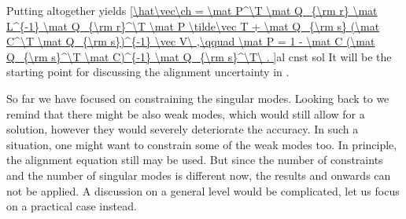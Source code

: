 Putting altogether yields
\eqref{\hat\vec\ch =
	\mat P^\T \mat Q_{\rm r} \mat L^{-1} \mat Q_{\rm r}^\T \mat P \tilde\vec T
	+ \mat Q_{\rm s} (\mat C^\T \mat Q_{\rm s})^{-1} \vec V\ ,\qquad
	\mat P = 1 - \mat C (\mat Q_{\rm s}^\T \mat C)^{-1} \mat Q_{\rm s}^\T\ .
}{al cnst sol}
It will be the starting point for discussing the alignment uncertainty in .

\iffalse
If we neglect the experimental errors that enter the $\tilde\vec T$ vector, it can be calculated from \Eq{al exact fit equation}: $\tilde\vec T = \bar\mat S \vec\ch$. We recall that $\vec\ch$ is the vector of true (not estimated) residuals. As the singular modes of $\tilde\mat S$ and $\bar\mat S$ are the same, one finds that $\bar\mat S E = 0$ too. Consequently, \Eq{al T no sing cont} leads to $\La = 0$. If the experimental errors are not neglected, the relation becomes only approximative: $\La \approx 0$. This provides a consistency check that may be used during real data analysis.
\fi

So far we have focused on constraining the singular modes. Looking back to  we remind that there might be also weak modes, which would still allow for a solution, however they would severely deteriorate the accuracy. In such a situation, one might want to constrain some of the weak modes too. In principle, the alignment equation  still may be used. But since the number of constraints and the number of singular modes is different now, the results  and onwards can not be applied. A discussion on a general level would be complicated, let us focus on a practical case instead.

